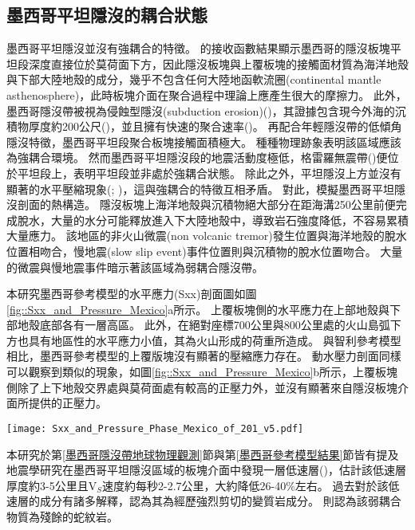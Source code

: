 \subsection{墨西哥平坦隱沒的耦合狀態}
墨西哥平坦隱沒並沒有強耦合的特徵。
\citet{PerezCampos2008}的接收函數結果顯示墨西哥的隱沒板塊平坦段深度直接位於莫荷面下方，因此隱沒板塊與上覆板塊的接觸面材質為海洋地殼與下部大陸地殼的成分，幾乎不包含任何大陸地函軟流圈(continental mantle asthenosphere)，此時板塊介面在聚合過程中理論上應產生很大的摩擦力。
此外，墨西哥隱沒帶被視為侵蝕型隱沒(subduction erosion)(\citealp{stern2011subduction})，其證據包含現今外海的沉積物厚度約200公尺(\citealp{manea2003sediment})，並且擁有快速的聚合速率(\citealp{o2005uncertainties})。
再配合年輕隱沒帶的低傾角隱沒特徵，墨西哥平坦段聚合板塊接觸面積極大。
種種物理跡象表明該區域應該為強耦合環境。
然而墨西哥平坦隱沒段的地震活動度極低，格雷羅無震帶(\citealp{kostoglodov2003large})便位於平坦段上，表明平坦段並非處於強耦合狀態。
除此之外，平坦隱沒上方並沒有顯著的水平壓縮現象(\citealp{nieto2006latest}; \citealp{moran2007cenozoic})，這與強耦合的特徵互相矛盾。
對此，\citet{Manea2011Thermal}模擬墨西哥平坦隱沒剖面的熱構造。
隱沒板塊上海洋地殼與沉積物絕大部分在距海溝250公里前便完成脫水，大量的水分可能釋放進入下大陸地殼中，導致岩石強度降低，不容易累積大量應力。
該地區的非火山微震(non volcanic tremor)發生位置與海洋地殼的脫水位置相吻合\citet{Manea2011Thermal}，慢地震(slow slip event)事件位置則與沉積物的脫水位置吻合\citet{Song2009}。
大量的微震與慢地震事件暗示著該區域為弱耦合隱沒帶。

本研究墨西哥參考模型的水平應力(Sxx)剖面圖如圖\ref{fig::Sxx_and_Pressure_Mexico}a所示。
上覆板塊側的水平應力在上部地殼與下部地殼底部各有一層高區。
此外，在絕對座標700公里與800公里處的火山島弧下方也具有地區性的水平應力小值，其為火山形成的荷重所造成。
與智利參考模型相比，墨西哥參考模型的上覆版塊沒有顯著的壓縮應力存在。
動水壓力剖面同樣可以觀察到類似的現象，如圖\ref{fig::Sxx_and_Pressure_Mexico}b所示，上覆板塊側除了上下地殼交界處與莫荷面處有較高的正壓力外，並沒有顯著來自隱沒板塊介面所提供的正壓力。
\begin{figure*}[ht!]
    \centering
    \texttt{[image: Sxx\_and\_Pressure\_Phase\_Mexico\_of\_201\_v5.pdf]}
    \caption[墨西哥參考模型中於40 Myr的剖面]{墨西哥參考模型中於40 Myr的水平軸差應力、動水壓力與岩相剖面。(a)水平軸差應力剖面，其中應力正向代表拉張應力，負向代表壓縮應力。(b)動水壓力剖面。(c)模型岩相剖面，岩相顏色請見圖\ref{fig::Ref Cocos 26}。}
    \label{fig::Sxx_and_Pressure_Mexico}
\end{figure*}

本研究於第\ref{墨西哥隱沒帶地球物理觀測}節與第\ref{墨西哥參考模型結果}節皆有提及地震學研究在墨西哥平坦隱沒區域的板塊介面中發現一層低速層(\citealp{PerezCampos2008})，\citealp{Song2009}估計該低速層厚度約3-5公里且V$_S$速度約每秒2-2.7公里，大約降低26-40$\%$左右。
過去對於該低速層的成分有諸多解釋，\citet{Song2012SC}認為其為經歷強烈剪切的變質岩成分。
\citet{Manea2017}則認為該弱耦合物質為殘餘的蛇紋岩。

